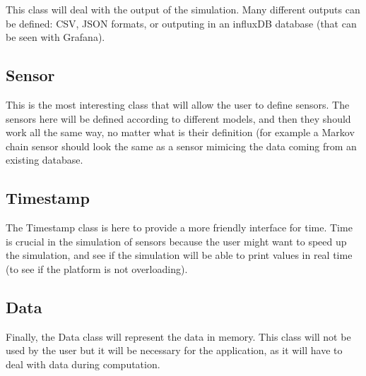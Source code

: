 This class will deal with the output of the simulation. Many different outputs can be defined: CSV, JSON formats, or outputing in an influxDB database (that can be seen with Grafana).


\subsection{Sensor}

This is the most interesting class that will allow the user to define sensors. The sensors here will be defined according to different models, and then they should work all the same way, no matter what is their definition (for example a Markov chain sensor should look the same as a sensor mimicing the data coming from an existing database.


\subsection{Timestamp}

The Timestamp class is here to provide a more friendly interface for time. Time is crucial in the simulation of sensors because the user might want to speed up the simulation, and see if the simulation will be able to print values in real time (to see if the platform is not overloading).


\subsection{Data}

Finally, the Data class will represent the data in memory. This class will not be used by the user but it will be necessary for the application, as it will have to deal with data during computation.








